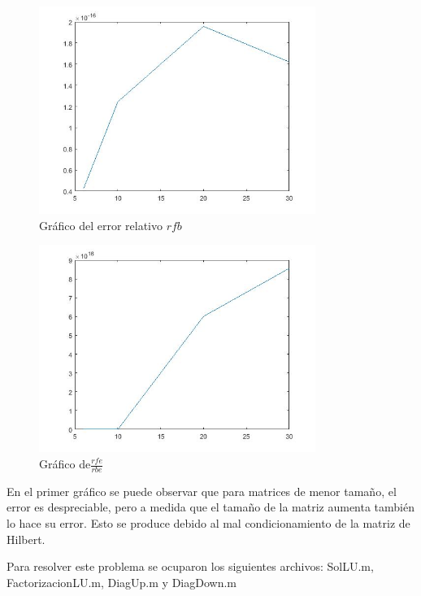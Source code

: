 \documentclass{udpreport}
\begin{document}
\begin{enumerate}
\begin{enumerate}
 			\begin{figure}[H]
 				\centering
 				\includegraphics[width=9cm]{grafo1-rbe}
 				\caption{Gráfico del error relativo $rfb$}		
 			\end{figure}
 			
 			\begin{figure}[H]
 				\centering
 				\includegraphics[width=9cm]{grafo1-div}
 				\caption{Gráfico de$\frac{rfe}{rbe}$}
	
 			\end{figure}
 		
 			En el primer gráfico se puede observar que para matrices de menor tamaño, el error es despreciable, pero a medida que el tamaño de la matriz aumenta también lo hace su error. Esto se produce debido al mal condicionamiento de la matriz de Hilbert.
 		\end{enumerate}
 		
 	Para resolver este problema se ocuparon los siguientes archivos: SolLU.m, FactorizacionLU.m, DiagUp.m y DiagDown.m	
 	

\end{enumerate}
\end{document}
